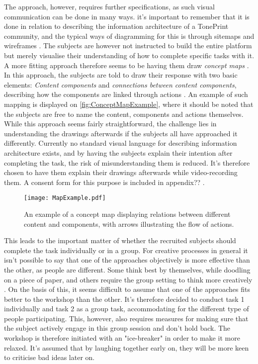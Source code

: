 The approach, however, requires further specifications, as such visual communication can be done in many ways. it's important to remember that it is done in relation to describing the information architecture of a TonePrint community, and the typical ways of diagramming for this is through sitemaps and wireframes \parencite[][392]{PDF:InformationArchitecture}. The subjects are however not instructed to build the entire platform but merely visualise their understanding of how to complete specific tasks with it. A more fitting approach therefore seems to be having them draw \textit{concept maps} \parencite[][113]{WEB:ConceptMapAnalysis}. In this approach, the subjects are told to draw their response with two basic elements: \textit{Content components} and \textit{connections between content components}, describing how the components are linked through actions \parencite[][393]{PDF:InformationArchitecture}. An example of such mapping is displayed on \autoref{fig:ConceptMapExample}, where it should be noted that the subjects are free to name the content, components and actions themselves. While this approach seems fairly straightforward, the challenge lies in understanding the drawings afterwards if the subjects all have approached it differently. Currently no standard visual language for describing information architecture exists, and by having the subjects explain their intention after completing the task, the risk of misunderstanding them is reduced. It's therefore chosen to have them explain their drawings afterwards while video-recording them. A consent form for this purpose is included in appendix?? .
%
\begin{figure}[H]
	\centering
	\texttt{[image: MapExample.pdf]}
	\caption{An example of a concept map displaying relations between different content and components, with arrows illustrating the flow of actions.}
	\label{fig:ConceptMapExample}
\end{figure}
%
\noindent
This leads to the important matter of whether the recruited subjects should complete the task individually or in a group. For creative processes in general it isn't possible to say that one of the approaches objectively is more effective than the other, as people are different. Some think best by themselves, while doodling on a piece of paper, and others require the group setting to think more creatively \parencite[][362]{PDF:InformationArchitecture}. On the basis of this, it seems difficult to assume that one of the approaches fits better to the workshop than the other. It's therefore decided to conduct task 1 individually and task 2 as a group task, accommodating for the different type of people participating. This, however, also requires measures for making sure that the subject actively engage in this group session and don't hold back. The workshop is therefore initiated with an "ice-breaker" in order to make it more relaxed. It's assumed that by laughing together early on, they will be more keen to criticise bad ideas later on.

